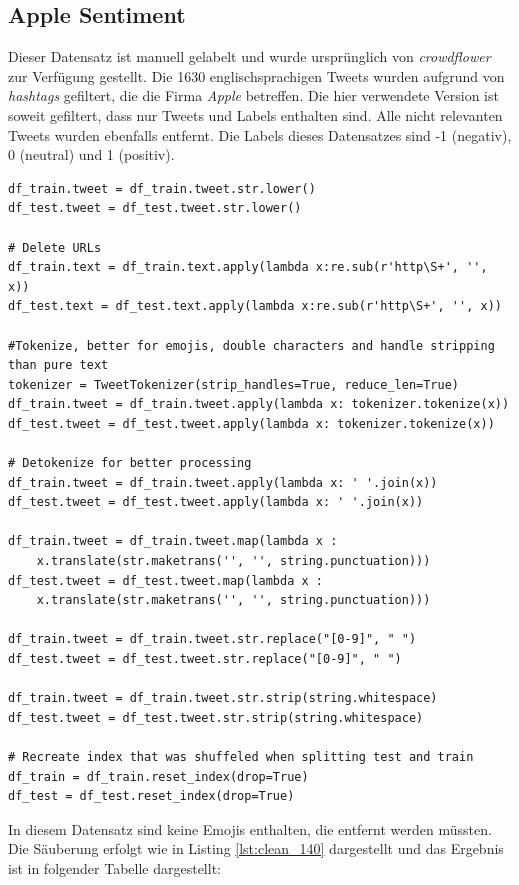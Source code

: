 \subsection{Apple Sentiment}
\label{sec:applesent}
Dieser Datensatz ist manuell gelabelt und wurde urspr\"unglich von \textit{crowdflower} \cite{crowdflower} zur Verf\"ugung gestellt. Die 1630 englischsprachigen Tweets wurden aufgrund von \textit{hashtags} gefiltert, die die Firma \textit{Apple} betreffen. Die hier verwendete Version \cite{apple_sent} ist soweit gefiltert, dass nur Tweets und Labels enthalten sind. Alle nicht relevanten Tweets wurden ebenfalls entfernt. Die Labels dieses Datensatzes sind -1 (negativ), 0 (neutral) und 1 (positiv).\\
\lstset{language=Python}
\lstset{frame=lines}
\lstset{captionpos=b}
\lstset{basicstyle=\footnotesize}
\begin{lstlisting}
df_train.tweet = df_train.tweet.str.lower()
df_test.tweet = df_test.tweet.str.lower()

# Delete URLs
df_train.text = df_train.text.apply(lambda x:re.sub(r'http\S+', '', x))
df_test.text = df_test.text.apply(lambda x:re.sub(r'http\S+', '', x))

#Tokenize, better for emojis, double characters and handle stripping than pure text
tokenizer = TweetTokenizer(strip_handles=True, reduce_len=True)
df_train.tweet = df_train.tweet.apply(lambda x: tokenizer.tokenize(x))
df_test.tweet = df_test.tweet.apply(lambda x: tokenizer.tokenize(x))

# Detokenize for better processing
df_train.tweet = df_train.tweet.apply(lambda x: ' '.join(x))
df_test.tweet = df_test.tweet.apply(lambda x: ' '.join(x))

df_train.tweet = df_train.tweet.map(lambda x : 
	x.translate(str.maketrans('', '', string.punctuation)))
df_test.tweet = df_test.tweet.map(lambda x : 
	x.translate(str.maketrans('', '', string.punctuation)))

df_train.tweet = df_train.tweet.str.replace("[0-9]", " ")
df_test.tweet = df_test.tweet.str.replace("[0-9]", " ")

df_train.tweet = df_train.tweet.str.strip(string.whitespace)
df_test.tweet = df_test.tweet.str.strip(string.whitespace)

# Recreate index that was shuffeled when splitting test and train
df_train = df_train.reset_index(drop=True)
df_test = df_test.reset_index(drop=True)
\end{lstlisting}
In diesem Datensatz sind keine Emojis enthalten, die entfernt werden m\"ussten. Die S\"auberung erfolgt wie in Listing \ref{lst:clean_140} dargestellt und das Ergebnis ist in folgender Tabelle dargestellt:

